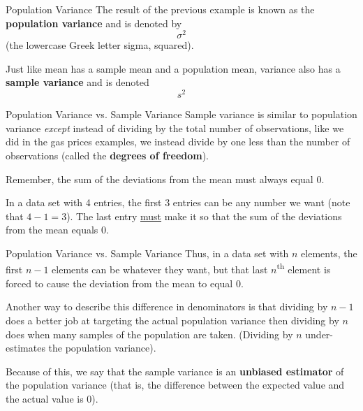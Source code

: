 \documentclass[t]{beamer}
\begin{document}
\begin{frame}{Population Variance}
The result of the previous example is known as the {\color{blue}\textbf{population variance}} and is denoted by \[\sigma^2\] 
(the lowercase Greek letter sigma, squared).	\newline\\	\pause

Just like mean has a sample mean and a population mean, variance also has a {\color{red}\textbf{sample variance}} and is denoted \[s^2\]
\end{frame}

\begin{frame}{Population Variance vs. Sample Variance}
Sample variance is similar to population variance \emph{except} instead of dividing by the total number of observations, like we did in the gas prices examples, we instead divide by one less than the number of observations (called the {\color{blue}\textbf{degrees of freedom}}).	\newline\\	\pause

Remember, the sum of the deviations from the mean must always equal 0. \newline\\	\pause

In a data set with 4 entries, the first 3 entries can be any number we want (note that $4 - 1 = 3$). The last entry \underline{must} make it so that the sum of the deviations from the mean equals 0.	
\end{frame}

\begin{frame}{Population Variance vs. Sample Variance}
Thus, in a data set with $n$ elements, the first $n-1$ elements can be whatever they want, but that last $n$\textsuperscript{th} element is forced to cause the deviation from the mean to equal 0.	\newline\\	\pause

Another way to describe this difference in denominators is that dividing by $n-1$ does a better job at targeting the actual population variance then dividing by $n$ does when many samples of the population are taken. (Dividing by $n$ under-estimates the population variance).	\newline\\	\pause

Because of this, we say that the sample variance is an {\color{blue}\textbf{unbiased estimator}} of the population variance (that is, the difference between the expected value and the actual value is 0).
\end{frame}
\end{document}
